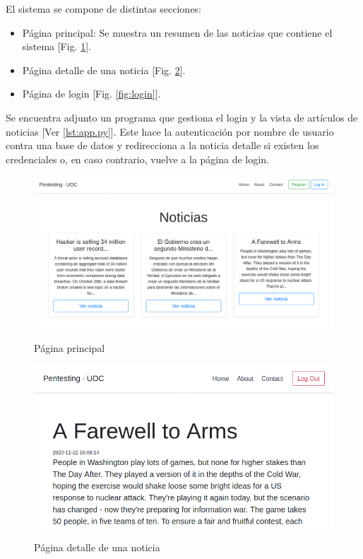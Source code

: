 \documentclass[a4paper,oneside]{article}
\begin{document}
El sistema se compone de distintas secciones:
\begin{itemize}
\item Página principal: Se muestra un resumen de las noticias que contiene el sistema [Fig. \ref{fig:principal}].
\item Página detalle de una noticia [Fig. \ref{fig:articulo}].
\item Página de login [Fig. \ref{fig:login}].
\end{itemize}

Se encuentra adjunto un programa que gestiona el login y la vista de artículos de noticias [Ver \ref{lst:app.py}]. Este hace la autenticación por nombre de usuario contra una base de datos y redirecciona a la noticia detalle si existen los credenciales o, en caso contrario, vuelve a la página de login. 

\begin{figure}[h!]
  \centering
  \includegraphics[scale=0.4]{images/index.png}\\
  \caption{Página principal}
  \label{fig:principal}
\end{figure}

\begin{figure}[h!]
  \centering
  \includegraphics[scale=0.5]{images/news.png}\\
  \caption{Página detalle de una noticia}
  \label{fig:articulo}
\end{figure}
\end{document}
